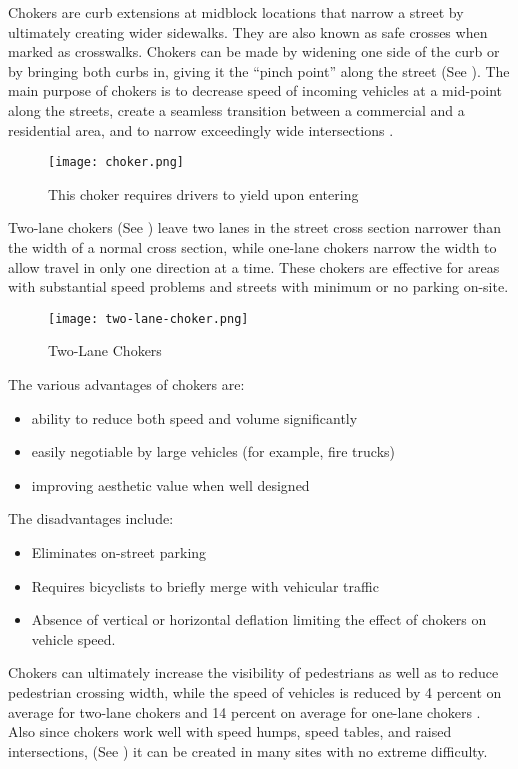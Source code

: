 Chokers are curb extensions at midblock locations that narrow a street by ultimately creating wider sidewalks. They are also known as safe crosses when marked as crosswalks. Chokers can be made by widening one side of the curb or by bringing both curbs in, giving it the “pinch point” along the street (See ). The main purpose of chokers is to decrease speed of incoming vehicles at a mid-point along the streets, create a seamless transition between a commercial and a residential area, and to narrow exceedingly wide intersections \cite{walking-info-chokers}.

\begin{figure}[h]
\centering
\texttt{[image: choker.png]}
\caption[Choker]{This choker requires drivers to yield upon entering}\label{fig:choker}
\end{figure}

Two-lane chokers (See ) leave two lanes in the street cross section narrower than the width of a normal cross section, while one-lane chokers narrow the width to allow travel in only one direction at a time. These chokers are effective for areas with substantial speed problems and streets with minimum or no parking on-site.

\begin{figure}
\centering
\texttt{[image: two-lane-choker.png]}
\caption{Two-Lane Chokers}\label{fig:two-lane-choker}
\end{figure}

The various advantages of chokers are:\begin{itemize}
\item ability to reduce both speed and volume significantly
\item easily negotiable by large vehicles (for example, fire trucks)
\item improving aesthetic value when well designed
\end{itemize}

The disadvantages include:\begin{itemize}
\item Eliminates on-street parking
\item Requires bicyclists to briefly merge with vehicular traffic
\item Absence of vertical or horizontal deflation limiting the effect of chokers on vehicle speed.
\end{itemize}

Chokers can ultimately increase the visibility of pedestrians as well as to reduce pedestrian crossing width, while the speed of vehicles is reduced by 4 percent on average for two-lane chokers and 14 percent on average for one-lane chokers \cite{ite}. Also since chokers work well with speed humps, speed tables, and raised intersections, (See ) it can be created in many sites with no extreme difficulty.


